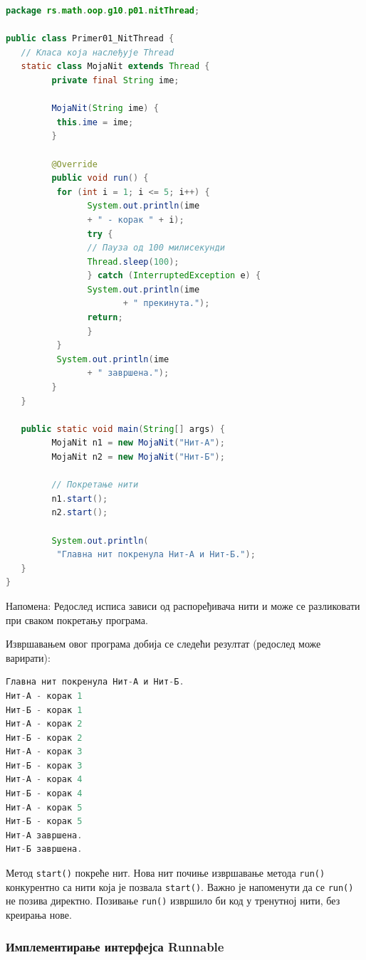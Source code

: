 \begin{lstlisting}[language=Java]
package rs.math.oop.g10.p01.nitThread;
 
public class Primer01_NitThread {
   // Класа која наслеђује Thread
   static class MojaNit extends Thread {
         private final String ime;
 
         MojaNit(String ime) {
          this.ime = ime;
         }
 
         @Override
         public void run() {
          for (int i = 1; i <= 5; i++) {
                System.out.println(ime
                + " - корак " + i);
                try {
                // Пауза од 100 милисекунди
                Thread.sleep(100);
                } catch (InterruptedException e) {
                System.out.println(ime
                       + " прекинута.");
                return;
                }
          }
          System.out.println(ime
                + " завршена.");
         }
   }
 
   public static void main(String[] args) {
         MojaNit n1 = new MojaNit("Нит-А");
         MojaNit n2 = new MojaNit("Нит-Б");
 
         // Покретање нити
         n1.start();
         n2.start();
 
         System.out.println(
          "Главна нит покренула Нит-А и Нит-Б.");
   }
}
\end{lstlisting}


Напомена: Редослед исписа зависи од распоређивача нити и може се разликовати при сваком покретању програма.

Извршавањем овог програма добија се следећи резултат (редослед може варирати):


\begin{lstlisting}[language=Java]
Главна нит покренула Нит-А и Нит-Б.
Нит-А - корак 1
Нит-Б - корак 1
Нит-А - корак 2
Нит-Б - корак 2
Нит-А - корак 3
Нит-Б - корак 3
Нит-А - корак 4
Нит-Б - корак 4
Нит-А - корак 5
Нит-Б - корак 5
Нит-А завршена.
Нит-Б завршена.
\end{lstlisting}


Метод \texttt{start()} покреће нит. Нова нит почиње извршавање метода \texttt{run()} конкурентно са нити која је позвала \texttt{start()}. Важно је напоменути да се \texttt{run()} не позива директно. Позивање \texttt{run()} извршило би код у тренутној нити, без креирања нове.


\subsubsection{Имплементирање интерфејса Runnable}

